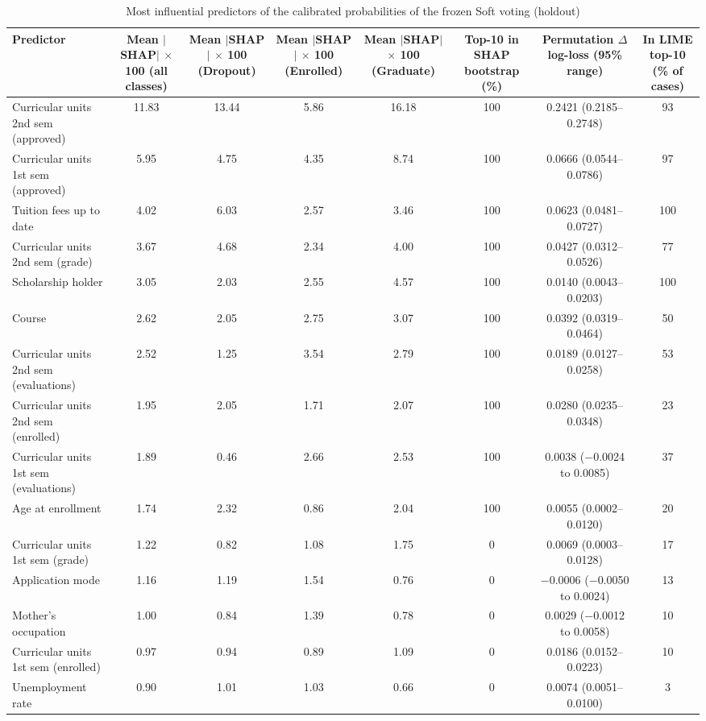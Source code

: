 \begin{table}
\caption{Most influential predictors of the calibrated probabilities of the frozen Soft voting (holdout)}\label{tab:Table8_explainability}
\footnotesize
\begin{tabular*}{\textwidth}{@{\extracolsep\fill}@{}lccccccc@{}}
\toprule
Predictor & Mean $|$SHAP$|$ $\times$ 100 (all classes) & Mean $|$SHAP$|$ $\times$ 100 (Dropout) & Mean $|$SHAP$|$ $\times$ 100 (Enrolled) & Mean $|$SHAP$|$ $\times$ 100 (Graduate) & Top-10 in SHAP bootstrap (\%) & Permutation $\Delta$ log-loss (95\% range) & In LIME top-10 (\% of cases) \\
\midrule
Curricular units 2nd sem (approved) & 11.83 & 13.44 & 5.86 & 16.18 & 100 & 0.2421 (0.2185--0.2748) & 93 \\
Curricular units 1st sem (approved) & 5.95 & 4.75 & 4.35 & 8.74 & 100 & 0.0666 (0.0544--0.0786) & 97 \\
Tuition fees up to date & 4.02 & 6.03 & 2.57 & 3.46 & 100 & 0.0623 (0.0481--0.0727) & 100 \\
Curricular units 2nd sem (grade) & 3.67 & 4.68 & 2.34 & 4.00 & 100 & 0.0427 (0.0312--0.0526) & 77 \\
Scholarship holder & 3.05 & 2.03 & 2.55 & 4.57 & 100 & 0.0140 (0.0043--0.0203) & 100 \\
Course & 2.62 & 2.05 & 2.75 & 3.07 & 100 & 0.0392 (0.0319--0.0464) & 50 \\
Curricular units 2nd sem (evaluations) & 2.52 & 1.25 & 3.54 & 2.79 & 100 & 0.0189 (0.0127--0.0258) & 53 \\
Curricular units 2nd sem (enrolled) & 1.95 & 2.05 & 1.71 & 2.07 & 100 & 0.0280 (0.0235--0.0348) & 23 \\
Curricular units 1st sem (evaluations) & 1.89 & 0.46 & 2.66 & 2.53 & 100 & 0.0038 ($-$0.0024 to 0.0085) & 37 \\
Age at enrollment & 1.74 & 2.32 & 0.86 & 2.04 & 100 & 0.0055 (0.0002--0.0120) & 20 \\
Curricular units 1st sem (grade) & 1.22 & 0.82 & 1.08 & 1.75 & 0 & 0.0069 (0.0003--0.0128) & 17 \\
Application mode & 1.16 & 1.19 & 1.54 & 0.76 & 0 & $-$0.0006 ($-$0.0050 to 0.0024) & 13 \\
Mother's occupation & 1.00 & 0.84 & 1.39 & 0.78 & 0 & 0.0029 ($-$0.0012 to 0.0058) & 10 \\
Curricular units 1st sem (enrolled) & 0.97 & 0.94 & 0.89 & 1.09 & 0 & 0.0186 (0.0152--0.0223) & 10 \\
Unemployment rate & 0.90 & 1.01 & 1.03 & 0.66 & 0 & 0.0074 (0.0051--0.0100) & 3 \\

\end{tabular*}
\end{table}
